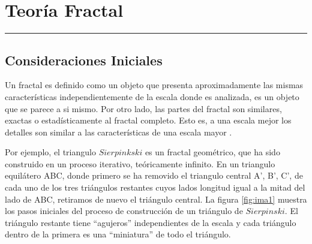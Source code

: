 
\chapter{Teoría Fractal}
\hrule \bigskip \vspace*{1cm}

\section{Consideraciones Iniciales}

Un fractal es definido como un objeto que presenta aproximadamente las mismas características independientemente de la escala donde es analizada, es un objeto que se parece a si mismo. Por otro lado, las partes del fractal son similares, exactas o estadísticamente  al  fractal completo. Esto es, a una escala mejor los detalles son similar a las características de una escala mayor \cite{Schroeder:1991,traina2005using}.
 
Por ejemplo, el triangulo $Sierpinkski$ es un fractal geométrico, que ha sido construido en un proceso iterativo, teóricamente infinito.  En un triangulo equilátero ABC, donde primero se ha removido el triangulo central A', B', C',  de cada uno de los tres triángulos restantes cuyos lados longitud igual a la mitad del lado de ABC, retiramos de nuevo el triángulo central. La figura \ref{fig:ima1} muestra los pasos iniciales del proceso de construcción de un triángulo de $Sierpinski$. El triángulo restante tiene ``agujeros'' independientes de la escala y cada triángulo dentro de la primera es una ``miniatura'' de todo el triángulo.

